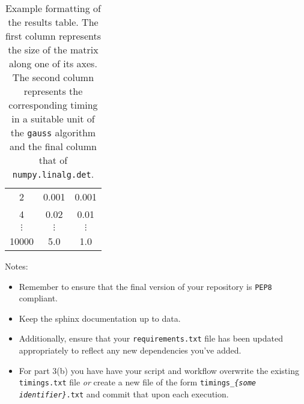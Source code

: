 \documentclass[a4paper,11pt]{article}
\begin{document}
\begin{table}
\begin{center}
\begin{tabular}{ c c c }
 2 & 0.001 & 0.001 \\ 
 4 & 0.02 & 0.01 \\  
 $\vdots$ & $\vdots$ & $\vdots$ \\
 10000 & 5.0 & 1.0
\end{tabular}
\end{center}
\caption{\label{timings_table}Example formatting of the results table. The first column represents
the size of the matrix along one of its axes. The second column represents the corresponding timing
in a suitable unit of the \texttt{gauss} algorithm and the final column that of \texttt{numpy.linalg.det}.}
\end{table}

Notes:
\begin{itemize}
 \item Remember to ensure that the final version of your repository is \texttt{PEP8} compliant.
 \item Keep the sphinx documentation up to data.
 \item Additionally, ensure that your \texttt{requirements.txt} file has been updated
 appropriately to reflect any new dependencies you've added.
 \item For part 3(b) you have have your script and workflow overwrite the existing
 \texttt{timings.txt} file \textit{or} create a new file of the form
 \texttt{timings\_\textit{\{some identifier\}}.txt} and commit that upon each execution.
\end{itemize}
\end{document}
